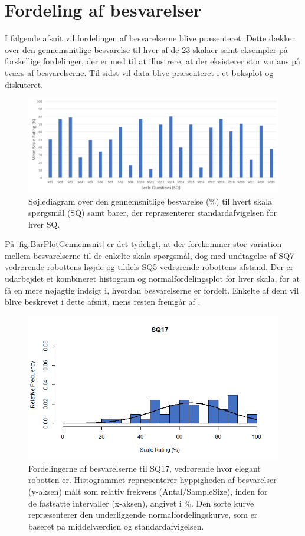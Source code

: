 \section{Fordeling af besvarelser}
\label{TestAfSkalaFordeling}
%
I følgende afsnit vil fordelingen af besvarelserne blive præsenteret. Dette dækker over den gennemsnitlige besvarelse til hver af de 23 skalaer samt eksempler på forskellige fordelinger, der er med til at illustrere, at der eksisterer stor varians på tværs af besvarelserne. Til sidst vil data blive præsenteret i et boksplot og diskuteret.
%
\begin{figure}[H]
\centering
\includegraphics[width = \textwidth]{Figure/DatabehandlingSkalaer/DataPresentation/MeanBarplot} 
 \caption{Søjlediagram over den gennemsnitlige besvarelse (\%) til hvert skala spørgsmål (SQ) samt barer, der repræsenterer standardafvigelsen for hver SQ.}
\label{fig:BarPlotGennemsnit}
\end{figure}
\noindent
%
På \autoref{fig:BarPlotGennemsnit} er det tydeligt, at der forekommer stor variation mellem besvarelserne til de enkelte skala spørgsmål, dog med undtagelse af SQ7 vedrørende robottens højde og tildels SQ5 vedrørende robottens afstand. \blankline
%
Der er udarbejdet et kombineret histogram og normalfordelingsplot for hver skala, for at få en mere nøjagtig indsigt i, hvordan besvarelserne er fordelt. Enkelte af dem vil blive beskrevet i dette afsnit, mens resten fremgår af .
%
\begin{figure}[H]
\centering
\includegraphics[width = \textwidth]{Figure/DatabehandlingSkalaer/HistogramNormalFordeling/SQ17} 
\caption{Fordelingerne af besvarelserne til SQ17, vedrørende hvor elegant robotten er. Histogrammet repræsenterer hyppigheden af besvarelser (y-aksen) målt som relativ frekvens (Antal/SampleSize), inden for de fastsatte intervaller (x-aksen), angivet i \%. Den sorte kurve repræsenterer den underliggende normalfordelingskurve, som er baseret på middelværdien og standardafvigelsen.}
\label{fig:Histogram17}
\end{figure}
